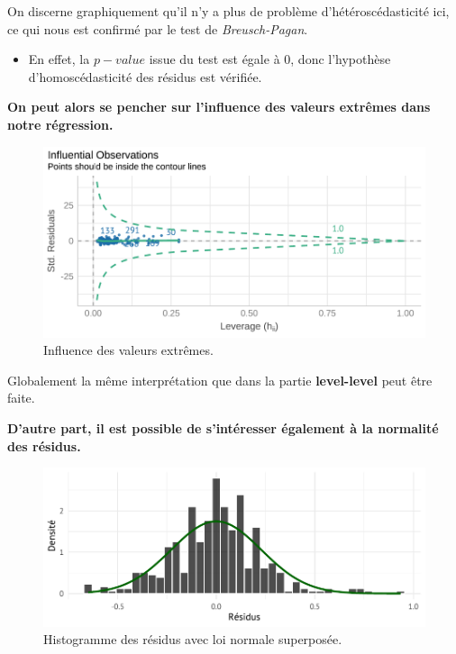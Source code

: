 \documentclass[
  12pt,
]{report}
\providecommand{\tightlist}{%
  \setlength{\itemsep}{0pt}\setlength{\parskip}{0pt}}\usepackage{longtable,booktabs,array}
\begin{document}
On discerne graphiquement qu'il n'y a plus de problème
d'hétéroscédasticité ici, ce qui nous est confirmé par le test de
\emph{Breusch-Pagan}.

\begin{itemize}
\tightlist
\item
  En effet, la \(p-value\) issue du test est égale à 0, donc l'hypothèse
  d'homoscédasticité des résidus est vérifiée.
\end{itemize}

\textbf{On peut alors se pencher sur l'influence des valeurs extrêmes
dans notre régression.}

\begin{figure}[H]

{\centering \includegraphics{report_files/figure-pdf/outliers_log-1.pdf}

}

\caption{Influence des valeurs extrêmes.}

\end{figure}%

Globalement la même interprétation que dans la partie
\textbf{level-level} peut être faite.

\textbf{D'autre part, il est possible de s'intéresser également à la
normalité des résidus.}

\begin{figure}[H]

{\centering \includegraphics{report_files/figure-pdf/normality_log-1.pdf}

}

\caption{Histogramme des résidus avec loi normale superposée.}

\end{figure}%
\end{document}
